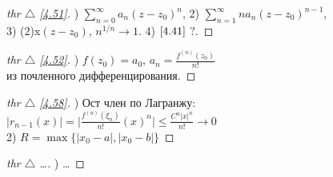 \begin{minipage}[]{0.45\textwidth}
\begin{proof}[
thr $\triangle$
\eqref{4.51}]

\phantom{42}

) $\sum_{n=0}^{\infty} a_n (z - z_0)^n$, 2) $\sum_{n=1}^{\infty} n a_n (z - z_0)^{n-1}$, \\
3) (2)x$(z-z_0)$, $n^{1/n} \to 1$. 4) $\eqref{4.41}$ $\boxed{?}$.
\end{proof}
\end{minipage}
\hfill
\begin{minipage}[]{0.45\textwidth}
\begin{proof}[
thr $\triangle$
\eqref{4.52}]

\phantom{42}

) $f(z_0) = a_0$, $a_n = \frac{f^{(n)}(z_0)}{n!}$ \\
из почленного дифференцирования.
\end{proof}
\end{minipage}





\begin{minipage}[t]{0.45\textwidth}
\begin{proof}[
thr $\triangle$
\eqref{4.58}]

\phantom{42}

) Ост член по Лагранжу: \\
$|r_{n-1}(x)| = 
\big| \frac{f^{(n)} (\xi_n)}{n!} (x)^n
\big| \leq \frac{C^n |x|^n}{n!} \to 0$ \\
2) $R = \max\{|x_0-a|, |x_0-b|\}$
\end{proof}
\end{minipage}
\hfill
\begin{minipage}[t]{0.45\textwidth}
\begin{proof}[
thr $\triangle$
\dots]

\phantom{42}

) \dots

\end{proof}
\end{minipage}

